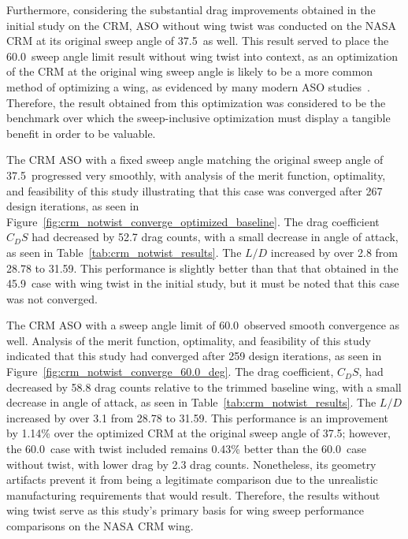 Furthermore, considering the substantial drag improvements obtained in the initial study on the CRM, ASO without wing twist was conducted on the NASA CRM at its original sweep angle of 37.5\degree\ as well. This result served to place the 60.0\degree\ sweep angle limit result without wing twist into context, as an optimization of the CRM at the original wing sweep angle is likely to be a more common method of optimizing a wing, as evidenced by many modern ASO studies~\cite{lyu_rans-based_2014, lyu_aerodynamic_2015, osusky_drag_2015, streuber_investigation_2017, koo_investigation_2018}. Therefore, the result obtained from this optimization was considered to be the benchmark over which the sweep-inclusive optimization must display a tangible benefit in order to be valuable.

The CRM ASO with a fixed sweep angle matching the original sweep angle of 37.5\degree\ progressed very smoothly, with analysis of the merit function, optimality, and feasibility of this study illustrating that this case was converged after 267 design iterations, as seen in Figure~\ref{fig:crm_notwist_converge_optimized_baseline}. The drag coefficient $C_D S$ had decreased by 52.7 drag counts, with a small decrease in angle of attack, as seen in Table~\ref{tab:crm_notwist_results}. The $L/D$ increased by over 2.8 from 28.78 to 31.59. This performance is slightly better than that that obtained in the 45.9\degree\ case with wing twist in the initial study, but it must be noted that this case was not converged.

The CRM ASO with a sweep angle limit of 60.0\degree\ observed smooth convergence as well. Analysis of the merit function, optimality, and feasibility of this study indicated that this study had converged after 259 design iterations, as seen in Figure~\ref{fig:crm_notwist_converge_60.0_deg}. The drag coefficient, $C_D S$, had decreased by 58.8 drag counts relative to the trimmed baseline wing, with a small decrease in angle of attack, as seen in Table~\ref{tab:crm_notwist_results}. The $L/D$ increased by over 3.1 from 28.78 to 31.59. This performance is an improvement by 1.14\% over the optimized CRM at the original sweep angle of 37.5\degree; however, the 60.0\degree\ case with twist included remains 0.43\% better than the 60.0\degree\ case without twist, with lower drag by 2.3 drag counts. Nonetheless, its geometry artifacts prevent it from being a legitimate comparison due to the unrealistic manufacturing requirements that would result. Therefore, the results without wing twist serve as this study's primary basis for wing sweep performance comparisons on the NASA CRM wing.


